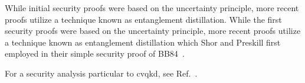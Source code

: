 While initial security proofs were based on the uncertainty principle, more recent proofs utilize a technique known as entanglement distillation.
While the first security proofs were based on the uncertainty principle, more recent proofs utilize a technique known as entanglement distillation which Shor and Preskill first employed in their simple security proof of BB84~\cite{Shor2000}.


For a security analysis particular to \gls{cvqkd}, see Ref.~\cite{Diamanti2015}.


